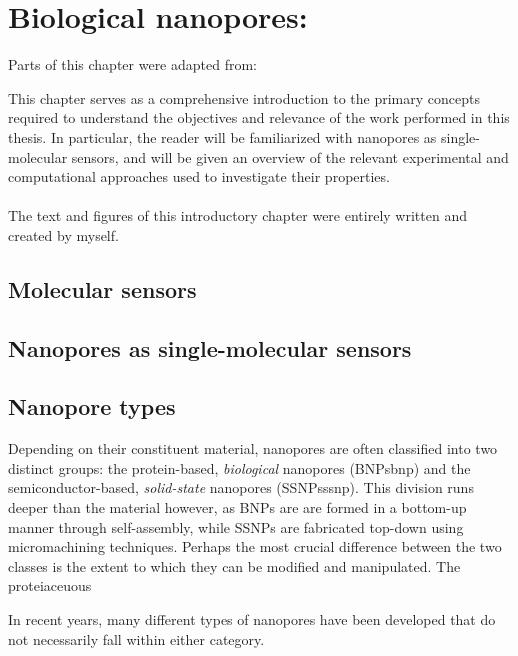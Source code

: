 \chapter{Biological nanopores: }\label{ch:nanopores}

\begin{shaded}
Parts of this chapter were adapted from:\\
\newpage
\end{shaded}

This chapter serves as a comprehensive introduction to the primary concepts required to understand the
objectives and relevance of the work performed in this thesis. In particular, the reader will be familiarized
with nanopores as single-molecular sensors, and will be given an overview of the relevant experimental and
computational approaches used to investigate their properties. \\
\\
The text and figures of this introductory chapter were entirely written and created by myself.

\newpage



\section{Molecular sensors}
\section{Nanopores as single-molecular sensors}



\section{Nanopore types}

Depending on their constituent material, nanopores are often classified into two distinct groups: the protein-based, \emph{biological} nanopores (BNPs\gls{bnp}) and the semiconductor-based, \emph{solid-state} nanopores (SSNPs\gls{ssnp}).\cite{Dekker-2007} This division runs deeper than the material however, as BNPs are are formed in a bottom-up manner through self-assembly, while SSNPs are fabricated top-down using micromachining techniques. Perhaps the most crucial difference between the two classes is the extent to which they can be modified and manipulated. The proteiaceuous

In recent years, many different types of nanopores have been developed that do not necessarily fall within either category. 





